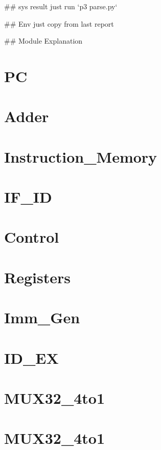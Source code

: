 ## sys result
just run `p3 parse.py`

## Env
just copy from last report

## Module Explanation

\section{PC}



\section{Adder}



\section{Instruction_Memory}



\section{IF_ID}



\section{Control}



\section{Registers}



\section{Imm_Gen}



\section{ID_EX}



\section{MUX32_4to1}



\section{MUX32_4to1}



